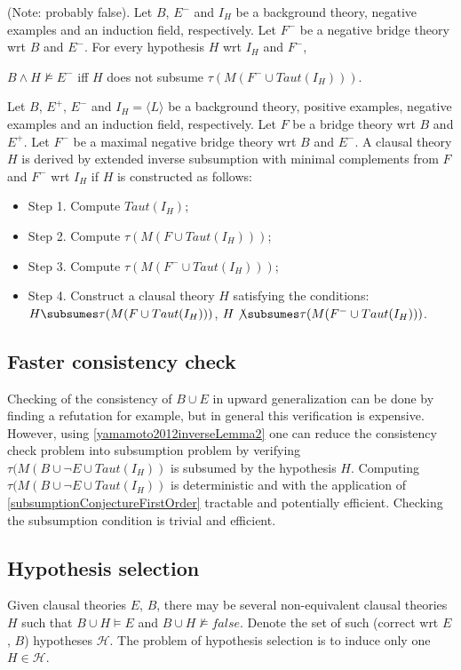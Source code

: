 \begin{conjecture}\label{subsumptionConjectureNegativeExamples}
(Note: probably false).
Let $B$, $E^{-}$ and $I_H$ be a background theory, negative examples and an induction field, respectively. Let $F^{-}$ be a negative bridge theory wrt $B$ and $E^{-}$. For every hypothesis $H$ wrt $I_H$ and $F^{-}$,

$B \wedge H \not\models E^{-}$ iff $H$ does not subsume
$\tau(M(F^{-} \cup Taut(I_H)))$.
\end{conjecture}

\begin{defn}
Let $B$, $E^{+}$, $E^{-}$ and $I_H = \langle L \rangle$ be a background theory, positive examples, negative examples and an induction field, respectively.
Let $F$ be a bridge theory wrt $B$ and $E^{+}$. Let $F^{-}$ be a maximal negative bridge theory wrt $B$ and $E^{-}$. A clausal theory $H$ is derived
by extended inverse subsumption with minimal complements from $F$ and $F^{-}$ wrt $I_H$ if $H$ is constructed as
follows:
\begin{itemize}
\item Step 1. Compute $Taut(I_H)$;
\item Step 2. Compute $\tau(M(F \cup Taut(I_H)))$;
\item Step 3. Compute $\tau(M(F^{-} \cup Taut(I_H)))$;
\item Step 4. Construct a clausal theory $H$ satisfying the conditions:
$H \subsumes \tau(M(F \cup Taut(I_H)))$,
$H \not\subsumes \tau(M(F^{-} \cup Taut(I_H)))$.
\end{itemize}
\end{defn}

\subsection{Faster consistency check\cite{yamamoto2012comparison}}
Checking of the consistency of $B \cup E$ in upward generalization can be done by finding a refutation for example, but in general this verification is expensive. However, using \ref{yamamoto2012inverseLemma2} one can reduce the consistency check problem into subsumption problem by verifying $\tau(M(B \cup \neg E \cup Taut(I_H))$ is subsumed by the hypothesis $H$. Computing $\tau(M(B \cup \neg E \cup Taut(I_H))$ is deterministic and with the application of \ref{subsumptionConjectureFirstOrder} tractable and potentially efficient. Checking the subsumption condition is trivial and efficient.

\subsection{Hypothesis selection}
Given clausal theories $E$, $B$, there may be several non-equivalent clausal theories $H$ such that $B \cup H \models E$ and $B \cup H \not\models false$. Denote the set of such (correct wrt $E$, $B$) hypotheses $\mathcal{H}$. The problem of hypothesis selection is to induce only one $H \in \mathcal{H}$.

